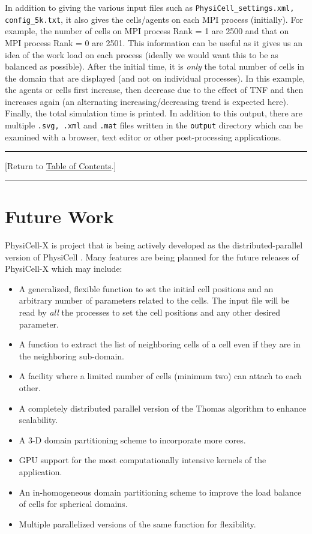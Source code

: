 \documentclass[12pt]{article}
\newcommand{\TOClink}{\begin{center}\hrule\vskip-5pt\phantom{.}\hfill[Return to \hyperlink{TOC}{Table of Contents}.]\hfill\phantom{.}\vskip3pt\hrule\end{center}}
\begin{document}
In addition to giving the various input files such as \texttt{PhysiCell\_settings.xml, config\_5k.txt}, it also gives the cells/agents on each MPI process (initially). For example, the number of cells on MPI process Rank = 1 are 2500 and that on MPI process Rank = 0 are 2501. This information can be useful as it gives us an idea of the work load on each process (ideally we would want this to be as balanced as possible). After the initial time, it is \textit{only}
the total number of cells in the domain that are displayed (and not on individual processes). In this example, the agents or cells first increase, then decrease due to the effect of TNF and then increases again (an alternating increasing/decreasing trend is expected here). Finally, the total simulation time is printed. In addition to this output, there are multiple \texttt{.svg, .xml} and \texttt{.mat} files written in the \texttt{output} directory which can be examined with a browser, text editor or other post-processing applications.  

\TOClink

\section{Future Work}
\label{sec:Future_Plans}
PhysiCell-X is project that is being actively developed as the distributed-parallel version of PhysiCell \cite{ref:PhysiCell}. Many features are being planned for the future releases of PhysiCell-X which may include:
\begin{itemize}
    \item A generalized, flexible function to set the initial cell positions and an arbitrary number of parameters related to the cells. The input file will be read by \textit{all} the processes to set the cell positions and any other desired parameter.
    
    \item A function to extract the list of neighboring cells of a cell even if they are in the neighboring sub-domain. 
    
    \item A facility where a limited number of cells (minimum two) can attach to each other.
    
    \item A completely distributed parallel version of the Thomas algorithm to enhance scalability.
    
    \item A 3-D domain partitioning scheme to incorporate more cores. 
    
    \item GPU support for the most computationally intensive kernels of the application. 
    
    \item An in-homogeneous domain partitioning scheme to improve the load balance of cells for spherical domains.
    
    \item Multiple parallelized versions of the same function for flexibility. 
\end{itemize}
\end{document}
